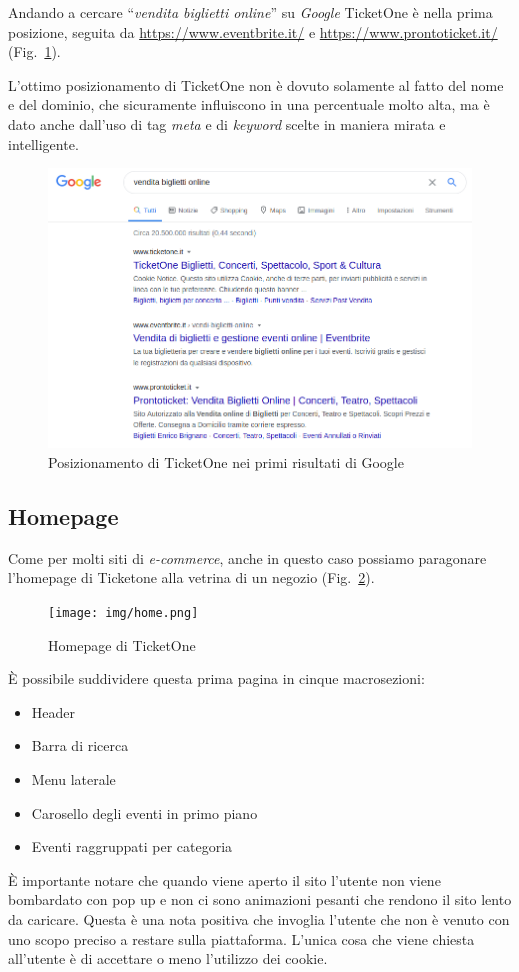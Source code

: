 	Andando a cercare ``\textit{vendita biglietti online}'' su \textit{Google} TicketOne è nella prima posizione, seguita da \url{https://www.eventbrite.it/} e \url{https://www.prontoticket.it/} (Fig.~\ref{posizionamento}).
	\par L'ottimo posizionamento di TicketOne non è dovuto solamente al fatto del nome e del dominio, che sicuramente influiscono in una percentuale molto alta, ma è dato anche dall'uso di tag \textit{meta} e di \textit{keyword} scelte in maniera mirata e intelligente.
	\begin{figure}[hbt]
		\centering
		\includegraphics[width=\textwidth]{img/posizionamento.png}
		\caption{Posizionamento di TicketOne nei primi risultati di Google}
		\label{posizionamento}
	\end{figure}

\subsection{Homepage}
	
	Come per molti siti di \textit{e-commerce}, anche in questo caso possiamo paragonare l'homepage di Ticketone alla vetrina di un negozio (Fig.~\ref{homepage}).
	\begin{figure}[hbt]
	    \centering
	    \texttt{[image: img/home.png]}
	    \caption{Homepage di TicketOne}
	    \label{homepage}
	\end{figure}
	\par \`E possibile suddividere questa prima pagina in cinque macrosezioni:
	\begin{itemize}[noitemsep]
		\item Header
		\item Barra di ricerca 
		\item Menu laterale
		\item Carosello degli eventi in primo piano
		\item Eventi raggruppati per categoria
	\end{itemize}
	\`E importante notare che quando viene aperto il sito l'utente non viene bombardato con pop up e non ci sono animazioni pesanti che rendono il sito lento da caricare.
	Questa è una nota positiva che invoglia l'utente che non è venuto con uno scopo preciso a restare sulla piattaforma.
	L'unica cosa che viene chiesta all'utente è di accettare o meno l'utilizzo dei cookie.

